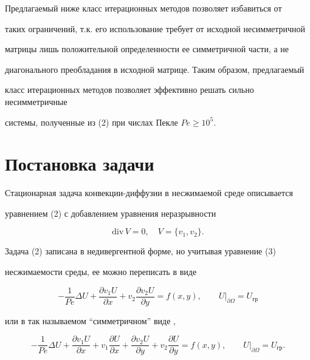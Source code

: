 Предлагаемый ниже класс итерационных методов позволяет избавиться от 


таких ограничений, т.к. его использование требует от исходной несимметричной 


матрицы лишь положительной определенности ее симметричной части, а не 


диагонального преобладания в исходной матрице. Таким образом, предлагаемый 


класс итерационных методов позволяет эффективно решать сильно несимметричные 


системы, полученные из (2) при числах Пекле $Pe\ge 10^5.$ 


 


\section{Постановка задачи} 


 


Стационарная задача конвекции-диффузии в несжимаемой среде описывается 


уравнением (2) с добавлением уравнения неразрывности 


\begin{equation} 


{\mathrm{div}}\,V=0,\quad V=\{v_1,v_2\}. 


\end{equation} 


Задача (2) записана в недивергентной форме, но учитывая уравнение (3) 


несжимаемости среды, ее можно переписать в виде 


\begin{equation} 


-\frac{1}{Pe}\Delta U + 


\frac{\partial v_1U}{\partial x}+


v_2\frac{\partial v_2U}{\partial y}=f(x,y),\qquad 


\left. U\right|_{\partial \Omega}=U_{\text{гр}} 


\end{equation} 


или в так называемом ``симметричном'' виде \cite{Vab}, \cite{Kru1} 


\begin{equation} 


-\frac{1}{Pe}\Delta U + 


\frac{\partial v_1U}{\partial x}+


v_1\frac{\partial U}{\partial x}+ 


\frac{\partial v_2U}{\partial y}+


v_2\frac{\partial U}{\partial y} 


=f(x,y),\qquad 


\left. U\right|_{\partial \Omega}=U_{\text{гр}}.


\end{equation} 


